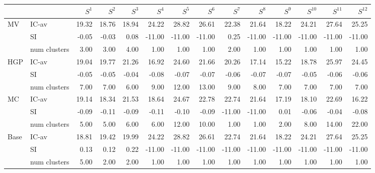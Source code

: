 \begin{tabular}{llrrrrrrrrrrrr}
\toprule
 &  & $S^{1}$ & $S^{2}$ & $S^{3}$ & $S^{4}$ & $S^{5}$ & $S^{6}$ & $S^{7}$ & $S^{8}$ & $S^{9}$ & $S^{10}$ & $S^{11}$ & $S^{12}$ \\
\midrule
\multirow[c]{3}{*}{MV} & IC-av & 19.32 & 18.76 & 18.94 & 24.22 & 28.82 & 26.61 & 22.38 & 21.64 & 18.22 & 24.21 & 27.64 & 25.25 \\
 & SI & -0.05 & -0.03 & 0.08 & -11.00 & -11.00 & -11.00 & 0.25 & -11.00 & -11.00 & -11.00 & -11.00 & -11.00 \\
 & num clusters & 3.00 & 3.00 & 4.00 & 1.00 & 1.00 & 1.00 & 2.00 & 1.00 & 1.00 & 1.00 & 1.00 & 1.00 \\
\multirow[c]{3}{*}{HGP} & IC-av & 19.04 & 19.77 & 21.26 & 16.92 & 24.60 & 21.66 & 20.26 & 17.14 & 15.22 & 18.78 & 25.97 & 24.45 \\
 & SI & -0.05 & -0.05 & -0.04 & -0.08 & -0.07 & -0.07 & -0.06 & -0.07 & -0.07 & -0.05 & -0.06 & -0.06 \\
 & num clusters & 7.00 & 7.00 & 6.00 & 9.00 & 12.00 & 13.00 & 9.00 & 8.00 & 7.00 & 7.00 & 7.00 & 7.00 \\
\multirow[c]{3}{*}{MC} & IC-av & 19.14 & 18.34 & 21.53 & 18.64 & 24.67 & 22.78 & 22.74 & 21.64 & 17.19 & 18.10 & 22.69 & 16.22 \\
 & SI & -0.09 & -0.11 & -0.09 & -0.11 & -0.10 & -0.09 & -11.00 & -11.00 & 0.01 & -0.06 & -0.04 & -0.08 \\
 & num clusters & 5.00 & 5.00 & 6.00 & 6.00 & 12.00 & 10.00 & 1.00 & 1.00 & 2.00 & 8.00 & 14.00 & 22.00 \\
\multirow[c]{3}{*}{Base} & IC-av & 18.81 & 19.42 & 19.99 & 24.22 & 28.82 & 26.61 & 22.74 & 21.64 & 18.22 & 24.21 & 27.64 & 25.25 \\
 & SI & 0.13 & 0.12 & 0.22 & -11.00 & -11.00 & -11.00 & -11.00 & -11.00 & -11.00 & -11.00 & -11.00 & -11.00 \\
 & num clusters & 5.00 & 2.00 & 2.00 & 1.00 & 1.00 & 1.00 & 1.00 & 1.00 & 1.00 & 1.00 & 1.00 & 1.00 \\
\bottomrule
\end{tabular}
